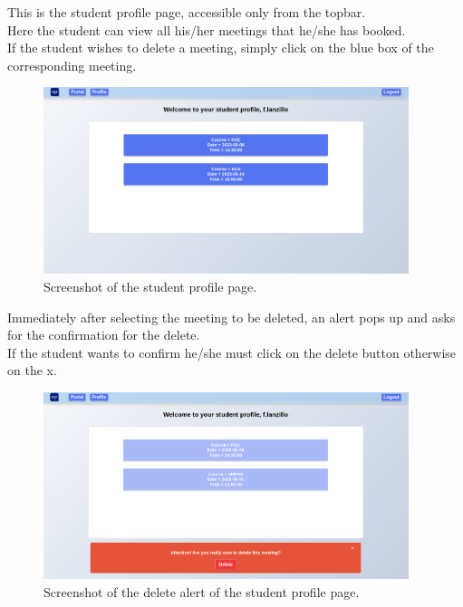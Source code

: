 This is the student profile page, accessible only from the topbar.\\
Here the student can view all his/her meetings that he/she has booked.\\
If the student wishes to delete a meeting, simply click on the blue box of the corresponding meeting.\\

\begin{figure}[H]
    \centering
     \includegraphics[width=0.95\textwidth]{img/user_manual/student/profile.png}
    \caption{\label{fig:student-profile-1} Screenshot of the student profile page.}
\end{figure}

Immediately after selecting the meeting to be deleted, an alert pops up and asks for the confirmation for the delete.\\
If the student wants to confirm he/she must click on the delete button otherwise on the x.\\

\begin{figure}[H]
    \centering
     \includegraphics[width=0.95\textwidth]{img/user_manual/student/profile-delete-alert.png}
    \caption{\label{fig:student-profile-2} Screenshot of the delete alert of the student profile page.}
\end{figure}

